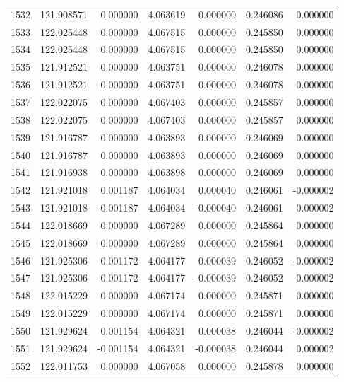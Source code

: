 \begin{tabular}{rrrrrrr}
1532 & 121.908571 &    0.000000 &  4.063619 &    0.000000 &    0.246086 &  0.000000 \\
1533 & 122.025448 &    0.000000 &  4.067515 &    0.000000 &    0.245850 &  0.000000 \\
1534 & 122.025448 &    0.000000 &  4.067515 &    0.000000 &    0.245850 &  0.000000 \\
1535 & 121.912521 &    0.000000 &  4.063751 &    0.000000 &    0.246078 &  0.000000 \\
1536 & 121.912521 &    0.000000 &  4.063751 &    0.000000 &    0.246078 &  0.000000 \\
1537 & 122.022075 &    0.000000 &  4.067403 &    0.000000 &    0.245857 &  0.000000 \\
1538 & 122.022075 &    0.000000 &  4.067403 &    0.000000 &    0.245857 &  0.000000 \\
1539 & 121.916787 &    0.000000 &  4.063893 &    0.000000 &    0.246069 &  0.000000 \\
1540 & 121.916787 &    0.000000 &  4.063893 &    0.000000 &    0.246069 &  0.000000 \\
1541 & 121.916938 &    0.000000 &  4.063898 &    0.000000 &    0.246069 &  0.000000 \\
1542 & 121.921018 &    0.001187 &  4.064034 &    0.000040 &    0.246061 & -0.000002 \\
1543 & 121.921018 &   -0.001187 &  4.064034 &   -0.000040 &    0.246061 &  0.000002 \\
1544 & 122.018669 &    0.000000 &  4.067289 &    0.000000 &    0.245864 &  0.000000 \\
1545 & 122.018669 &    0.000000 &  4.067289 &    0.000000 &    0.245864 &  0.000000 \\
1546 & 121.925306 &    0.001172 &  4.064177 &    0.000039 &    0.246052 & -0.000002 \\
1547 & 121.925306 &   -0.001172 &  4.064177 &   -0.000039 &    0.246052 &  0.000002 \\
1548 & 122.015229 &    0.000000 &  4.067174 &    0.000000 &    0.245871 &  0.000000 \\
1549 & 122.015229 &    0.000000 &  4.067174 &    0.000000 &    0.245871 &  0.000000 \\
1550 & 121.929624 &    0.001154 &  4.064321 &    0.000038 &    0.246044 & -0.000002 \\
1551 & 121.929624 &   -0.001154 &  4.064321 &   -0.000038 &    0.246044 &  0.000002 \\
1552 & 122.011753 &    0.000000 &  4.067058 &    0.000000 &    0.245878 &  0.000000 \\

\end{tabular}
